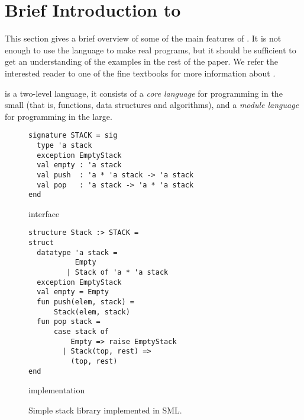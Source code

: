 \documentclass[workingdraft]{usetex-v1}
\begin{document}
\section{Brief Introduction to \sml{}}
\label{sec:brief-intr-sml}

This section gives a brief overview of some of the main features of
\sml{}.  It is not enough to use the language to make real programs,
but it should be sufficient to get an understanding of the examples in
the rest of the paper.  We refer the interested reader to one of the
fine textbooks \cite{Hansen-Rischel:1999,Paulson:1996} for more
information about \sml{}.



\sml{} is a two-level language, it consists of a \emph{core language}
for programming in the small (that is, functions, data structures and
algorithms), and a \emph{module language} for programming in the large.


\begin{figure*}[thp]
\mbox{}\hfill{}

\begin{subfloat}
\begin{minipage}[b]{.46\linewidth}
\begin{verbatim}
signature STACK = sig 
  type 'a stack
  exception EmptyStack
  val empty : 'a stack
  val push  : 'a * 'a stack -> 'a stack
  val pop   : 'a stack -> 'a * 'a stack
end
\end{verbatim}
\end{minipage}
\caption{\label{fig:stack-sig}interface}
\end{subfloat}
\qquad
\begin{subfloat}
\begin{minipage}[b]{.46\linewidth}
\begin{verbatim}
structure Stack :> STACK =
struct
  datatype 'a stack =
           Empty
         | Stack of 'a * 'a stack
  exception EmptyStack
  val empty = Empty
  fun push(elem, stack) = 
      Stack(elem, stack)
  fun pop stack =
      case stack of
          Empty => raise EmptyStack
        | Stack(top, rest) => 
          (top, rest)
end
\end{verbatim}
\end{minipage}
\caption{\label{fig:stack-struct}implementation}
\end{subfloat}
\hfill\mbox{}
\caption{Simple stack library implemented in SML.}
  \label{fig:stack-lib}
\end{figure*}
\end{document}
